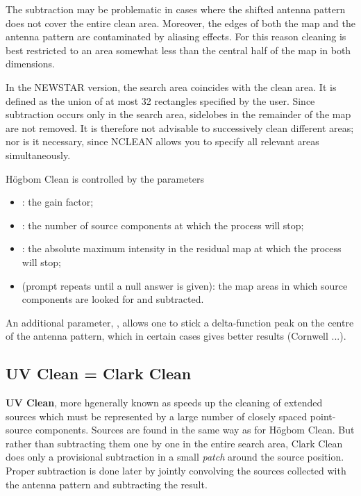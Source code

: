 	The subtraction may be problematic in cases where the shifted antenna
pattern does not cover the entire clean area.  Moreover, the edges of both the
map and the antenna pattern are contaminated by aliasing effects.  For this
reason cleaning is best restricted to an area somewhat less than the central
half of the map in both dimensions.

	In the NEWSTAR version, the search area coincides with the clean area.
It is defined as the union of at most 32 rectangles specified by the user.
Since subtraction occurs only in the search area, sidelobes in the remainder of
the map are not removed.  It is therefore not advisable to successively clean
different areas; nor is it necessary, since NCLEAN allows you to specify all
relevant areas simultaneously.

	H\"ogbom Clean is controlled by the parameters

\begin{itemize}
\item   {}: the gain
factor;

\item   {}: the
number of source components at which the process will stop;

\item   {}: the
absolute maximum intensity in the residual map at which the process will stop;

\item   {} (prompt repeats until a
null answer is given): the map areas in which source components are looked for
and subtracted. %
\end{itemize}

\label{.prussian.hat}
	An additional parameter,
, allows one to
stick a delta-function peak on the centre of the antenna pattern, which in
certain cases gives better results (Cornwell ...).


\subsection{ UV Clean = Clark Clean }
\label{.uv.clean}

	{\bf UV Clean}, more hgenerally known as 
speeds up the cleaning of extended sources which must be represented by a large
number of closely spaced point-source components. Sources are found in the same
way as for H\"ogbom Clean.  But rather than subtracting them one by one in the
entire search area, Clark Clean does only a provisional subtraction in a small
{\em patch} around the source position.  Proper subtraction is done later by
jointly convolving the sources collected with the antenna pattern and
subtracting the result.

